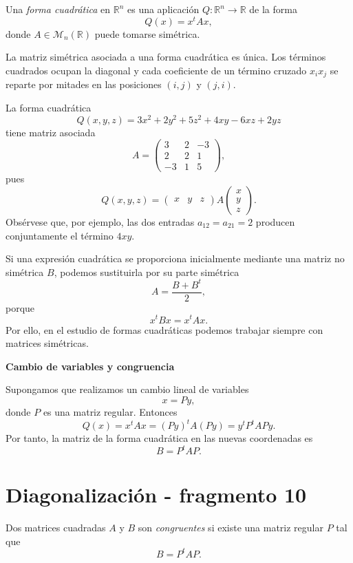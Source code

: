 \begin{definition}
Una \emph{forma cuadrática} en $\mathbb{R}^n$ es una aplicación $Q:\mathbb{R}^n\to\mathbb{R}$ de la forma
\[
Q(x)=x^tAx,
\]
donde $A\in\mathcal M_n(\mathbb{R})$ puede tomarse simétrica.
\end{definition}

La matriz simétrica asociada a una forma cuadrática es única. Los términos cuadrados ocupan la diagonal y cada coeficiente de un término cruzado $x_ix_j$ se reparte por mitades en las posiciones $(i,j)$ y $(j,i)$.

\begin{example}
La forma cuadrática
\[
Q(x,y,z)=3x^2+2y^2+5z^2+4xy-6xz+2yz
\]
tiene matriz asociada
\[
A=\begin{pmatrix}
3&2&-3\\
2&2&1\\
-3&1&5
\end{pmatrix},
\]
pues
\[
Q(x,y,z)=
\begin{pmatrix}x&y&z\end{pmatrix}
A
\begin{pmatrix}x\\y\\z\end{pmatrix}.
\]
Obsérvese que, por ejemplo, las dos entradas $a_{12}=a_{21}=2$ producen conjuntamente el término $4xy$.
\end{example}

Si una expresión cuadrática se proporciona inicialmente mediante una matriz no simétrica $B$, podemos sustituirla por su parte simétrica
\[
A=\frac{B+B^t}{2},
\]
porque
\[
x^tBx=x^tAx.
\]
Por ello, en el estudio de formas cuadráticas podemos trabajar siempre con matrices simétricas.

\textbf{Cambio de variables y congruencia}

Supongamos que realizamos un cambio lineal de variables
\[
x=Py,
\]
donde $P$ es una matriz regular. Entonces
\[
Q(x)=x^tAx=(Py)^tA(Py)=y^tP^tAPy.
\]
Por tanto, la matriz de la forma cuadrática en las nuevas coordenadas es
\[
\boxed{B=P^tAP.}
\]


\section{Diagonalización - fragmento 10}
\begin{definition}
Dos matrices cuadradas $A$ y $B$ son \emph{congruentes} si existe una matriz regular $P$ tal que
\[
B=P^tAP.
\]
\end{definition}

